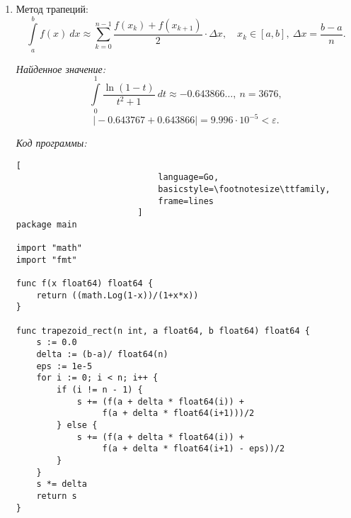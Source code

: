 \documentclass[14pt, a4paper, titlepage, fleqn]{extarticle}
\begin{document}
\begin{enumerate}
\begin{lstlisting}[
                            language=Go,
                            basicstyle=\footnotesize\ttfamily,
                            frame=lines
                        ]
import "math"
import "fmt"

func f(x float64) float64 {
    return ((math.Log(1-x))/(1+x*x))
}

func center_rect(n int, a float64, b float64) float64 {
    s := 0.0
    delta := (b-a)/ float64(n)
    for i := 0; i < n; i++ {
        s += f((2*a + delta * float64(2*i + 1))/2)
    }
    s *= delta
    return s
}

func main() {
    n := 0
    eps := 1e-4
    a := 0.0
    b := 1.0
    real := -0.643767
    s := 10000
    n=0
    for math.Abs(real - s) >= eps {
        n++
        s = center_rect(n,a,b)
    }
    fmt.Println(s, n, math.Abs(real-s))
}
                        \end{lstlisting}
                
                \pagebreak

                \item Метод трапеций:
                    \[
                        \int\limits_a^b f(x) ~ dx \approx
                        \sum_{k=0}^{n-1} 
                        \frac{f\left( x_k \right) + f\left(x_{k+1}\right)}{2}
                        \cdot \Delta x,
                        \quad x_k \in [a, b], ~ \Delta x = \frac{b-a}{n}.  
                    \]

                    \textit{Найденное значение:}
                        \[
                            \int\limits_0^1 \frac{\ln(1-t)}{t^2+1} ~ dt \approx
                            -0.643866\dots, ~ n = 3676,
                        \]
                        \[
                            \vert-0.643767+0.643866\vert = 9.996
                            \cdot 10^{-5} < \varepsilon.
                        \]

                    \pagebreak

                    \textit{Код программы:}
                        \begin{lstlisting}[
                            language=Go,
                            basicstyle=\footnotesize\ttfamily,
                            frame=lines
                        ]
package main

import "math"
import "fmt"

func f(x float64) float64 {
    return ((math.Log(1-x))/(1+x*x))
}

func trapezoid_rect(n int, a float64, b float64) float64 {
    s := 0.0
    delta := (b-a)/ float64(n)
    eps := 1e-5
    for i := 0; i < n; i++ {
        if (i != n - 1) {
            s += (f(a + delta * float64(i)) +
                 f(a + delta * float64(i+1)))/2
        } else {
            s += (f(a + delta * float64(i)) +
                 f(a + delta * float64(i+1) - eps))/2
        }
    }
    s *= delta
    return s
}


\end{lstlisting}
\end{enumerate}
\end{document}
